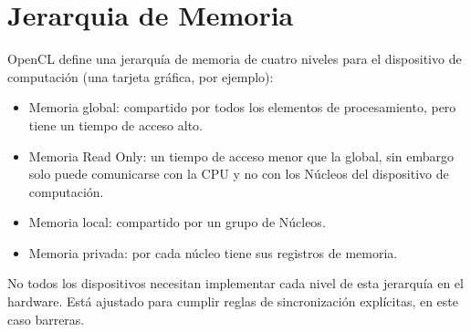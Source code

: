 \section{Jerarquia de Memoria}

OpenCL define una jerarquía de memoria de cuatro niveles para el dispositivo de computación (una tarjeta gráfica, por ejemplo):

\begin{itemize}
	\item Memoria global: compartido por todos los elementos de procesamiento, pero tiene un tiempo de acceso alto.
	\item Memoria Read Only: un tiempo de acceso menor que la global, sin embargo solo puede comunicarse con la CPU y no con los Núcleos del dispositivo de computación.
	\item Memoria local: compartido por un grupo de Núcleos.
	\item Memoria privada: por cada núcleo tiene sus registros de memoria.
\end{itemize}


No todos los dispositivos necesitan implementar cada nivel de esta jerarquía en el hardware. Está ajustado para cumplir reglas de sincronización explícitas, en este caso barreras.